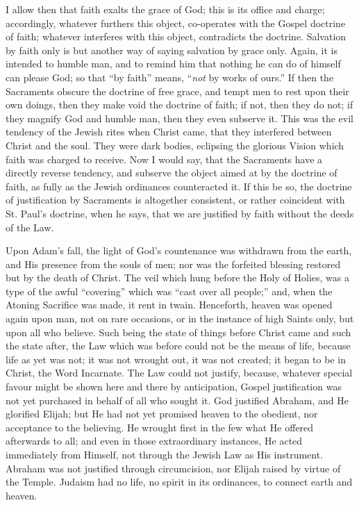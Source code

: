 I allow then that faith exalts the grace of God; this is its office
and charge; accordingly, whatever furthers this object,
co-operates with the Gospel doctrine of faith; whatever interferes with
this object, contradicts the doctrine. Salvation by faith only is but
another way of saying salvation by grace only. Again, it is intended
to humble man, and to remind him that nothing he can do of himself can
please God; so that ``by faith'' means, ``\emph{not} by
works of ours.'' If then the Sacraments obscure the doctrine of
free grace, and tempt men to rest upon their own doings, then they
make void the doctrine of faith; if not, then they do not; if they
magnify God and humble man, then they even subserve it. This was the
evil tendency of the Jewish rites when Christ came, that they
interfered between Christ and the soul. They were dark bodies,
eclipsing the glorious Vision which faith was charged to receive. Now
I would say, that the Sacraments have a directly reverse tendency, and
subserve the object aimed at by the doctrine of faith, as fully as the
Jewish ordinances counteracted it. If this be so, the doctrine of
justification by Sacraments is altogether consistent, or rather
coincident with St. Paul's doctrine, when he says, that we are
justified by faith without the deeds of the Law.

Upon Adam's fall, the light of God's countenance was withdrawn from
the earth, and His presence from the souls of men; nor was the
forfeited blessing restored but by the death of Christ. The veil which
hung before the Holy of Holies, was a type of the awful
``covering'' which was ``cast over all people;'' and,
when the Atoning Sacrifice was made, it rent in twain. Henceforth,
heaven was opened again upon man, not on rare occasions, or in the
instance of high Saints only, but upon all who believe. Such
being the state of things before Christ came and such the state after,
the Law which was before could not be the means of life, because life
as yet was not; it was not wrought out, it was not created; it began
to be in Christ, the Word Incarnate. The Law could not justify,
because, whatever special favour might be shown here and there by
anticipation, Gospel justification was not yet purchased in behalf of
all who sought it. God justified Abraham, and He glorified Elijah; but
He had not yet promised heaven to the obedient, nor acceptance to the
believing. He wrought first in the few what He offered afterwards to
all; and even in those extraordinary instances, He acted immediately
from Himself, not through the Jewish Law as His instrument. Abraham was
not justified through circumcision, nor Elijah raised by virtue of the
Temple. Judaism had no life, no spirit in its ordinances, to connect
earth and heaven.

